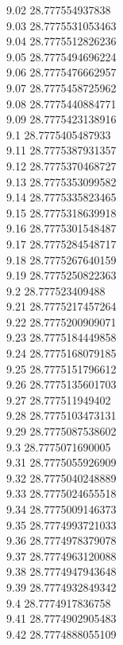 {9.02	28.777554937838\\
9.03	28.7775531053463\\
9.04	28.7775512826236\\
9.05	28.7775494696224\\
9.06	28.7775476662957\\
9.07	28.7775458725962\\
9.08	28.7775440884771\\
9.09	28.7775423138916\\
9.1	28.7775405487933\\
9.11	28.7775387931357\\
9.12	28.7775370468727\\
9.13	28.7775353099582\\
9.14	28.7775335823465\\
9.15	28.7775318639918\\
9.16	28.7775301548487\\
9.17	28.7775284548717\\
9.18	28.7775267640159\\
9.19	28.7775250822363\\
9.2	28.777523409488\\
9.21	28.7775217457264\\
9.22	28.7775200909071\\
9.23	28.7775184449858\\
9.24	28.7775168079185\\
9.25	28.7775151796612\\
9.26	28.7775135601703\\
9.27	28.777511949402\\
9.28	28.7775103473131\\
9.29	28.7775087538602\\
9.3	28.7775071690005\\
9.31	28.7775055926909\\
9.32	28.7775040248889\\
9.33	28.7775024655518\\
9.34	28.7775009146373\\
9.35	28.7774993721033\\
9.36	28.7774978379078\\
9.37	28.7774963120088\\
9.38	28.7774947943648\\
9.39	28.7774932849342\\
9.4	28.7774917836758\\
9.41	28.7774902905483\\
9.42	28.7774888055109\\
}
